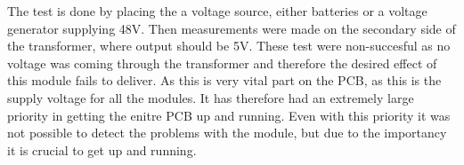 The test is done by placing the a voltage source, either batteries or a voltage generator supplying 48V. Then measurements were made on the secondary side of the transformer, where output should be 5V. These test were non-succesful as no voltage was coming through the transformer and therefore the desired effect of this module fails to deliver. As this is very vital part on the PCB, as this is the supply voltage for all the modules. It has therefore had an extremely large priority in getting the enitre PCB up and running. Even with this priority it was not possible to detect the problems with the module, but due to the importancy it is crucial to get up and running.  
